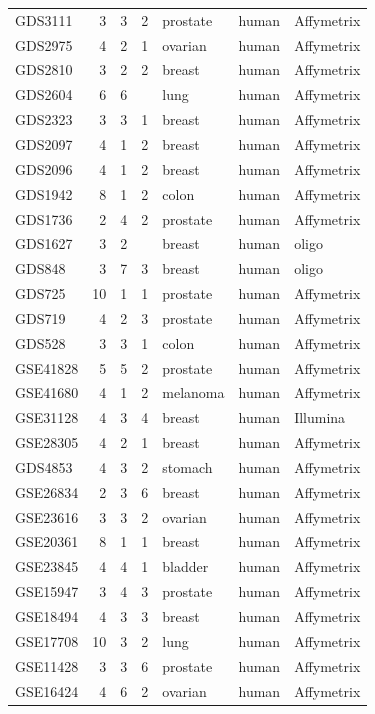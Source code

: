 \documentclass[a4paper]{article}
\begin{document}
\begin{table}
{\begin{tabular}{lrrrlll}
GDS3111	&	3	&	3	&	2	&	prostate	&	human	&	Affymetrix	\\
GDS2975	&	4	&	2	&	1	&	ovarian	&	human	&	Affymetrix	\\
GDS2810	&	3	&	2	&	2	&	breast	&	human	&	Affymetrix	\\
GDS2604	&	6	&	6	&		&	lung	&	human 	&	Affymetrix	\\
GDS2323	&	3	&	3	&	1	&	breast	&	human 	&	Affymetrix	\\
GDS2097	&	4	&	1	&	2	&	breast	&	human 	&	Affymetrix	\\
GDS2096	&	4	&	1	&	2	&	breast	&	human 	&	Affymetrix	\\
GDS1942	&	8	&	1	&	2	&	colon	&	human	&	Affymetrix	\\
GDS1736	&	2	&	4	&	2	&	prostate	&	human	&	Affymetrix	\\
GDS1627	&	3	&	2	&		&	breast	&	human	&	oligo	\\
GDS848	&	3	&	7	&	3	&	breast	&	human	&	oligo	\\
GDS725	&	10	&	1	&	1	&	prostate	&	human	&	Affymetrix	\\
GDS719	&	4	&	2	&	3	&	prostate	&	human	&	Affymetrix	\\
GDS528	&	3	&	3	&	1	&	colon	&	human	&	Affymetrix	\\
GSE41828	&	5	&	5	&	2	&	prostate	&	human	&	Affymetrix	\\
GSE41680	&	4	&	1	&	2	&	melanoma	&	human	&	Affymetrix	\\
GSE31128	&	4	&	3	&	4	&	breast	&	human 	&	Illumina	\\
GSE28305	&	4	&	2	&	1	&	breast	&	human	&	Affymetrix	\\
GDS4853	&	4	&	3	&	2	&	stomach	&	human	&	Affymetrix	\\
GSE26834	&	2	&	3	&	6	&	breast	&	human	&	Affymetrix	\\
GSE23616	&	3	&	3	&	2	&	ovarian	&	human	&	Affymetrix	\\
GSE20361	&	8	&	1	&	1	&	breast	&	human	&	Affymetrix	\\
GSE23845	&	4	&	4	&	1	&	bladder	&	human	&	Affymetrix	\\
GSE15947	&	3	&	4	&	3	&	prostate	&	human	&	Affymetrix	\\
GSE18494	&	4	&	3	&	3	&	breast	&	human	&	Affymetrix	\\
GSE17708	&	10	&	3	&	2	&	lung	&	human	&	Affymetrix	\\
GSE11428	&	3	&	3	&	6	&	prostate	&	human	&	Affymetrix	\\
GSE16424	&	4	&	6	&	2	&	ovarian	&	human	&	Affymetrix	\\

\end{tabular}}
\end{table}
\end{document}

